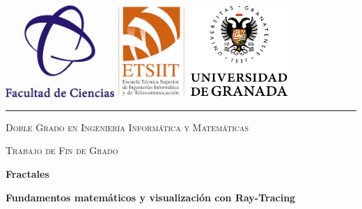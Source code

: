 \begin{titlepage}
	\includegraphics[height=35mm]{img/LogoFacultadCiencias.png}
	\includegraphics[height=35mm]{img/LogoETSIIT.png}
	\hfill
	\includegraphics[height=35mm]{img/LogoUGR.png}
	\hspace{1cm}

\vspace{0.5cm}
\hrule
\vspace{1cm}
{\Large\centering \textsc{Doble Grado en Ingeniería Informática y Matemáticas} \par}
{\Large\centering \textsc{Trabajo de Fin de Grado} \par}


	\vspace{1cm}
	{\Huge\centering \textbf{Fractales} \par}
	\vspace{0.5cm}
	{\LARGE\centering \textbf{Fundamentos matemáticos y visualización con Ray-Tracing} \par}
	\vspace{2cm}


\end{titlepage}
